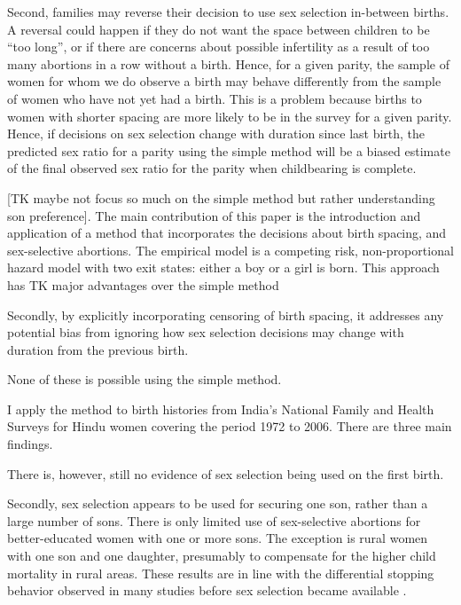 \documentclass[12pt,letterpaper]{article}
\begin{document}
Second, families may reverse their decision to use sex selection in-between births.
A reversal could happen if they do not want the space between children to be 
``too long'', or if there are concerns about possible infertility as a result of 
too many abortions in a row without a birth.
Hence, for a given parity, the sample of women for whom we do observe a birth 
may behave differently from the sample of women who have not yet had a birth.
This is a problem because births to women with shorter spacing are more likely 
to be in the survey for a given parity.
Hence, if decisions on sex selection change with duration since last birth,
the predicted sex ratio for a parity using the simple method will be a 
biased estimate of the final observed sex ratio for the parity when 
childbearing is complete.



[TK maybe not focus so much on the simple method but rather understanding son preference].
The main contribution of this paper is the introduction and application of a method that 
incorporates the decisions about birth spacing, and sex-selective abortions.
The empirical model is a competing risk, non-proportional hazard model with two exit 
states: either a boy or a girl is born.
This approach has TK major advantages over the simple method 

Secondly, by explicitly incorporating censoring of birth spacing, it addresses any 
potential bias from ignoring how sex selection decisions may change with duration from 
the previous birth.

None of these is possible using the simple method.

I apply the method to birth histories from India's National Family and Health Surveys 
for Hindu women covering the period 1972 to 2006. 
There are three main findings.

There is, however, still no evidence of sex selection being used on the first birth.

Secondly, sex selection appears to be used for securing one son, rather than a large 
number of sons.
There is only limited use of sex-selective abortions for better-educated
women with one or more sons.
The exception is rural women with one son and one daughter, presumably to compensate for 
the higher child mortality in rural areas.
These results are in line with the differential stopping behavior observed in many studies
before sex selection became available \citep{repetto72,arnold98,dreze01}.
\end{document}
